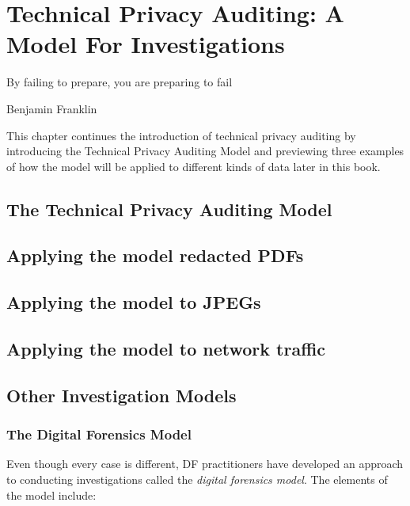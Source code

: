 \chapter{Technical Privacy Auditing: A Model For Investigations}
\setlength{\epigraphwidth}{3in}
\epigraph{By failing to prepare, you are preparing to fail}{Benjamin Franklin}

This chapter continues the introduction of technical privacy
auditing by introducing the Technical Privacy Auditing Model and
previewing three examples of how the model will be applied to
different kinds of data later in this book.

\section{The Technical Privacy Auditing Model}

\section{Applying the model redacted PDFs}

\section{Applying the model to JPEGs}

\section{Applying the model to network traffic}


\section{Other Investigation Models}

\subsection{The Digital Forensics Model}

Even though every case is different, DF practitioners have developed an
approach to conducting investigations called the 
\emph{digital forensics model}\cite{pollitt:models}. The 
elements of the model include:


